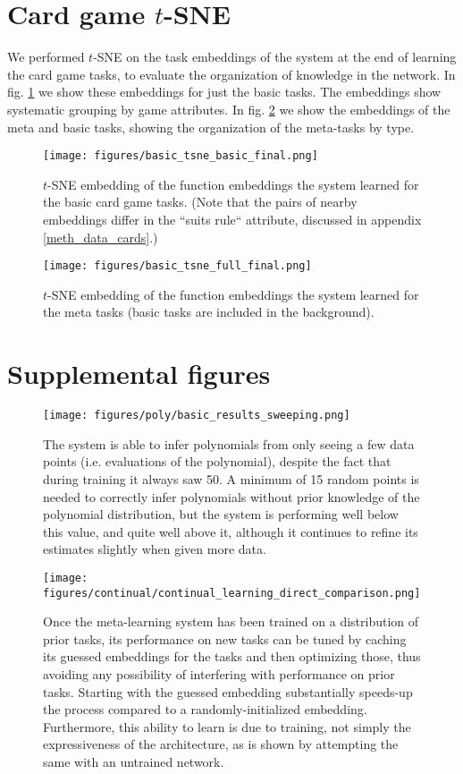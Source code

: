 \documentclass{article}
\begin{document}
\section{Card game $t$-SNE} \label{app_cards_tsne}
We performed $t$-SNE \citep{LaurensvanderMaaten2008} on the task embeddings of the system at the end of learning the card game tasks, to evaluate the organization of knowledge in the network. In fig. \ref{fig_cards_tsne_basic} we show these embeddings for just the basic tasks. The embeddings show systematic grouping by game attributes. In fig. \ref{fig_cards_tsne_full} we show the embeddings of the meta and basic tasks, showing the organization of the meta-tasks by type. \par 
\begin{figure}[H]
\centering
\texttt{[image: figures/basic\_tsne\_basic\_final.png]}
\caption{$t$-SNE embedding of the function embeddings the system learned for the basic card game tasks. (Note that the pairs of nearby embeddings differ in the ``suits rule`` attribute, discussed in appendix \ref{meth_data_cards}.)} 
\label{fig_cards_tsne_basic}
\end{figure}%
\begin{figure}[H]
\centering
\texttt{[image: figures/basic\_tsne\_full\_final.png]}
\caption{$t$-SNE embedding of the function embeddings the system learned for the meta tasks (basic tasks are included in the background).} 
\label{fig_cards_tsne_full}
\end{figure}


\section{Supplemental figures}
\begin{figure}[H]
\centering
\texttt{[image: figures/poly/basic\_results\_sweeping.png]}
\caption{The system is able to infer polynomials from only seeing a few data points (i.e. evaluations of the polynomial), despite the fact that during training it always saw 50. A minimum of 15 random points is needed to correctly infer polynomials without prior knowledge of the polynomial distribution, but the system is performing well below this value, and quite well above it, although it continues to refine its estimates slightly when given more data.}
\label{supp_poly_sweep_results}
\end{figure}

\begin{figure}[H]
\centering
\texttt{[image: figures/continual/continual\_learning\_direct\_comparison.png]}
\caption{Once the meta-learning system has been trained on a distribution of prior tasks, its performance on new tasks can be tuned by caching its guessed embeddings for the tasks and then optimizing those, thus avoiding any possibility of interfering with performance on prior tasks. Starting with the guessed embedding substantially speeds-up the process compared to a randomly-initialized embedding. Furthermore, this ability to learn is due to training, not simply the expressiveness of the architecture, as is shown by attempting the same with an untrained network.}
\label{supp_poly_continual_results}
\end{figure}
\end{document}
